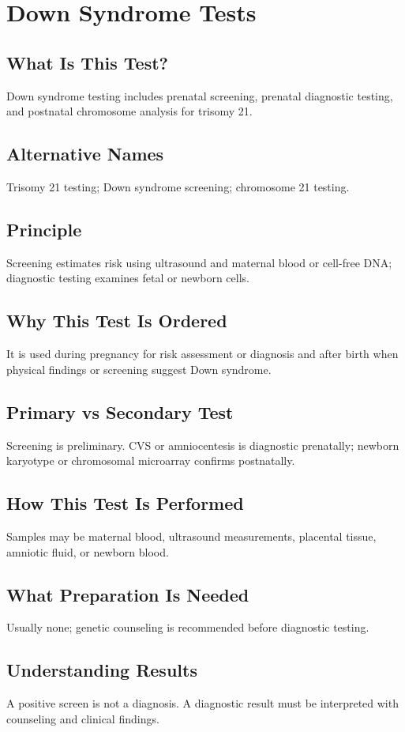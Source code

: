 \chapter{Down Syndrome Tests}
\section*{What Is This Test?} Down syndrome testing includes prenatal screening, prenatal diagnostic testing, and postnatal chromosome analysis for trisomy 21.
\section*{Alternative Names} Trisomy 21 testing; Down syndrome screening; chromosome 21 testing.
\section*{Principle} Screening estimates risk using ultrasound and maternal blood or cell-free DNA; diagnostic testing examines fetal or newborn cells.
\section*{Why This Test Is Ordered} It is used during pregnancy for risk assessment or diagnosis and after birth when physical findings or screening suggest Down syndrome.
\section*{Primary vs Secondary Test} Screening is preliminary. CVS or amniocentesis is diagnostic prenatally; newborn karyotype or chromosomal microarray confirms postnatally.
\section*{How This Test Is Performed} Samples may be maternal blood, ultrasound measurements, placental tissue, amniotic fluid, or newborn blood.
\section*{What Preparation Is Needed} Usually none; genetic counseling is recommended before diagnostic testing.
\section*{Understanding Results} A positive screen is not a diagnosis. A diagnostic result must be interpreted with counseling and clinical findings.
